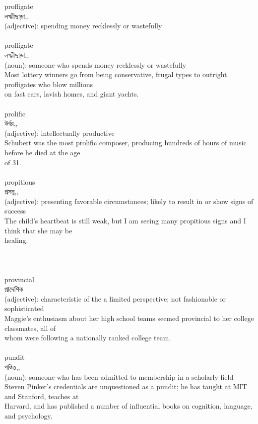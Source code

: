 \documentclass{article}
\begin{document}
{profligate}\\
{লক্ষ্মীছাড়া,,}\\
{(adjective): spending money recklessly or wastefully\\}\\
{profligate}\\
{লক্ষ্মীছাড়া,,}\\
{(noun): someone who spends money recklessly or wastefully\\Most lottery winners go from being conservative, frugal types to outright profligates who blow millions\\on fast cars, lavish homes, and giant yachts.\\}\\
{prolific}\\
{উর্বর,,}\\
{(adjective): intellectually productive\\Schubert was the most prolific composer, producing hundreds of hours of music before he died at the age\\of 31.\\}\\
{propitious}\\
{প্রসন্ন,,}\\
{(adjective): presenting favorable circumstances; likely to result in or show signs of success\\The child's heartbeat is still weak, but I am seeing many propitious signs and I think that she may be\\healing.\\\\                                                                                \\}\\
{provincial}\\
{প্রাদেশিক}\\
{(adjective): characteristic of the a limited perspective; not fashionable or sophisticated\\Maggie's enthusiasm about her high school teams seemed provincial to her college classmates, all of\\whom were following a nationally ranked college team.\\}\\
{pundit}\\
{পণ্ডিত,,}\\
{(noun): someone who has been admitted to membership in a scholarly field\\Steven Pinker's credentials are unquestioned as a pundit; he has taught at MIT and Stanford, teaches at\\Harvard, and has published a number of influential books on cognition, language, and psychology.\\}\\
\end{document}
